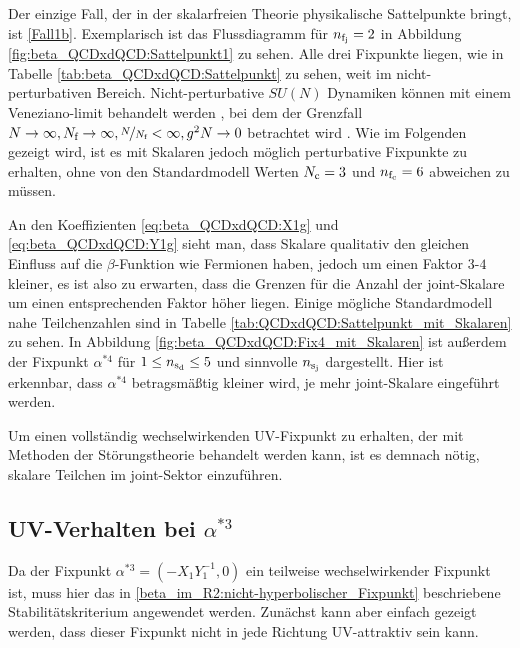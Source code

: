       Der einzige Fall, der in der skalarfreien Theorie physikalische 
      Sattelpunkte bringt, ist \ref{Fall1b}. Exemplarisch ist 
      das Flussdiagramm für $n_{\text{f}_\text{j}}=2$ in Abbildung
      \ref{fig:beta_QCDxdQCD:Sattelpunkt1} zu sehen. Alle drei Fixpunkte 
      liegen, wie in Tabelle \ref{tab:beta_QCDxdQCD:Sattelpunkt} zu sehen, 
      weit im nicht-perturbativen Bereich. Nicht-perturbative 
      $SU(N)$ Dynamiken können mit einem Veneziano-limit behandelt werden 
      \cite{Jarvinen:2011qe}\cite{Asymptotic_safety_guaranteed}, bei dem der 
      Grenzfall $N \to \infty , N_\text{f} \to \infty,\nicefrac{N}{N_\text{f}} 
      <\infty,g^2 N\to 0$ betrachtet wird \cite{VENEZIANO1979213}. Wie im 
      Folgenden gezeigt wird, ist es mit Skalaren jedoch möglich perturbative 
      Fixpunkte zu erhalten, ohne von den Standardmodell Werten $N_\text{c}=3$ und 
      $n_{\text{f}_\text{c}}=6$ abweichen zu müssen. 
      

      An den Koeffizienten \eqref{eq:beta_QCDxdQCD:X1g} und 
      \eqref{eq:beta_QCDxdQCD:Y1g} sieht man, dass Skalare qualitativ den 
      gleichen Einfluss auf die $\beta$-Funktion wie Fermionen haben, 
      jedoch um einen Faktor $3$-$4$ kleiner, es ist also zu erwarten, dass 
      die Grenzen für die Anzahl der joint-Skalare um einen 
      entsprechenden Faktor höher liegen. Einige mögliche Standardmodell nahe 
      Teilchenzahlen sind in Tabelle 
      \ref{tab:QCDxdQCD:Sattelpunkt_mit_Skalaren} zu sehen. 
      In Abbildung \ref{fig:beta_QCDxdQCD:Fix4_mit_Skalaren} ist außerdem 
      der Fixpunkt $\alpha^{*4}$ für $1\leq n_{\text{s}_\text{d}} \leq 5$ und sinnvolle $n_{\text{s}_\text{j}}$ 
      dargestellt. Hier ist erkennbar, dass $\alpha^{*4}$ betragsmäßtig kleiner 
      wird, je mehr joint-Skalare eingeführt werden.

      
      
      
      Um einen vollständig wechselwirkenden UV-Fixpunkt zu erhalten, der mit 
      Methoden der Störungstheorie behandelt werden kann, ist es demnach 
      nötig, skalare Teilchen im joint-Sektor einzuführen. 

      
      
  \subsection{UV-Verhalten bei $\alpha^{*3}$}
    Da der Fixpunkt $\alpha^{*3}=(-X_1 Y_1^{-1},0)$ ein teilweise 
    wechselwirkender Fixpunkt ist, 
    muss hier das in \ref{beta_im_R2:nicht-hyperbolischer_Fixpunkt} 
    beschriebene Stabilitätskriterium angewendet werden. Zunächst kann aber 
    einfach gezeigt werden, dass dieser Fixpunkt nicht in jede Richtung 
    UV-attraktiv sein kann.
    
